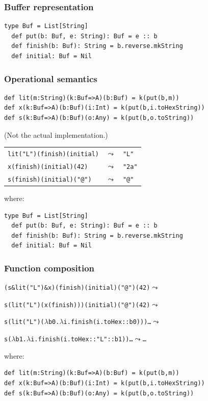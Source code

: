\documentclass[14pt,t,usepdftitle=false,
xcolornames=x11names,svgnames,dvipsnames]{beamer}
\begin{document}
\begin{frame}[fragile]
  \frametitle{Buffer representation}
\begin{lstlisting}[style=scala,moreemph={Buf}]
  type Buf = List[String]
  def put(b: Buf, e: String): Buf = e :: b
  def finish(b: Buf): String = b.reverse.mkString
  def initial: Buf = Nil
\end{lstlisting}
\end{frame}

\begin{frame}[fragile]
  \frametitle{Operational semantics}
\begin{lstlisting}[style=scala,moreemph={Buf}]
def lit(m:String)(k:Buf=>A)(b:Buf) = k(put(b,m))
def x(k:Buf=>A)(b:Buf)(i:Int) = k(put(b,i.toHexString))
def s(k:Buf=>A)(b:Buf)(o:Any) = k(put(b,o.toString))
\end{lstlisting}
  {\vskip-3mm\footnotesize\hfill(Not the actual implementation.)}
  \begin{center}
  \begin{tabular}[t]{l@{~}c@{~}l}
    \lstinline!lit("L")(finish)(initial)!
    &$\leadsto$& \lstinline!"L"!\\
    \lstinline!x(finish)(initial)(42)!
    &$\leadsto$& \lstinline!"2a"!\\
    \lstinline!s(finish)(initial)("@")!
    &$\leadsto$& \lstinline!"@"!\\
  \end{tabular}
  \end{center}
where:
\begin{lstlisting}[style=scala,moreemph={Buf}]
  type Buf = List[String]
  def put(b: Buf, e: String): Buf = e :: b
  def finish(b: Buf): String = b.reverse.mkString
  def initial: Buf = Nil
\end{lstlisting}
\end{frame}

\begin{frame}[fragile]
  \frametitle{Function composition}
  \begin{alltt}\small
(s \verb+&+ lit("L") \verb+&+ x) (finish) (initial) ("@") (42) \(\leadsto\)    

s(lit("L")(\textcolor{input}{x}(finish))) (initial) ("@") (42) \(\leadsto\)

s(\textcolor{input}{lit("L")}(\textcolor{emph}{\(\lambda\)b0.\(\lambda\)i.finish(i.toHex :: b0)})) \dots \(\leadsto\)

\textcolor{input}{s}(\(\lambda\)b1.\(\lambda\)i.finish(i.toHex :: "L" :: b1)) \dots \(\leadsto\) \dots
\end{alltt}
where:
\begin{lstlisting}[style=scala,moreemph={Buf}]
def lit(m:String)(k:Buf=>A)(b:Buf) = k(put(b,m))
def x(k:Buf=>A)(b:Buf)(i:Int) = k(put(b,i.toHexString))
def s(k:Buf=>A)(b:Buf)(o:Any) = k(put(b,o.toString))
\end{lstlisting}
\end{frame}
\end{document}
